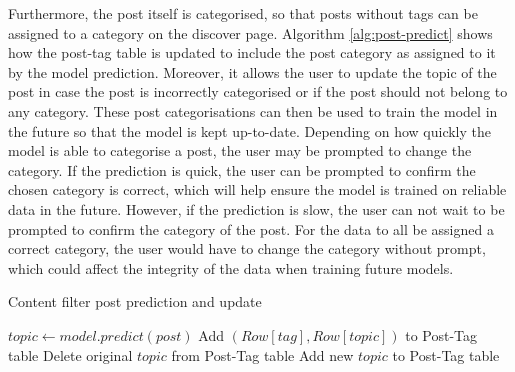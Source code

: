 Furthermore, the post itself is categorised, so that posts without tags can be assigned to a category on the discover page. Algorithm \ref{alg:post-predict} shows how the post-tag table is updated to include the post category as assigned to it by the model prediction. Moreover, it allows the user to update the topic of the post in case the post is incorrectly categorised or if the post should not belong to any category. These post categorisations can then be used to train the model in the future so that the model is kept up-to-date. Depending on how quickly the model is able to categorise a post, the user may be prompted to change the category. If the prediction is quick, the user can be prompted to confirm the chosen category is correct, which will help ensure the model is trained on reliable data in the future. However, if the prediction is slow, the user can not wait to be prompted to confirm the category of the post. For the data to all be assigned a correct category, the user would have to change the category without prompt, which could affect the integrity of the data when training future models.   

\begin{algorithm}
\caption{Content filter post prediction and update}
\label{alg:post-predict}
\begin{algorithmic}[1]
	\State $topic\gets model.predict(post)$
	\State Add $(Row[tag],Row[topic])$ to Post-Tag table
		Delete original $topic$ from Post-Tag table
		Add new $topic$ to Post-Tag table
	\EndIf
\EndFunction
\end{algorithmic}
\end{algorithm}